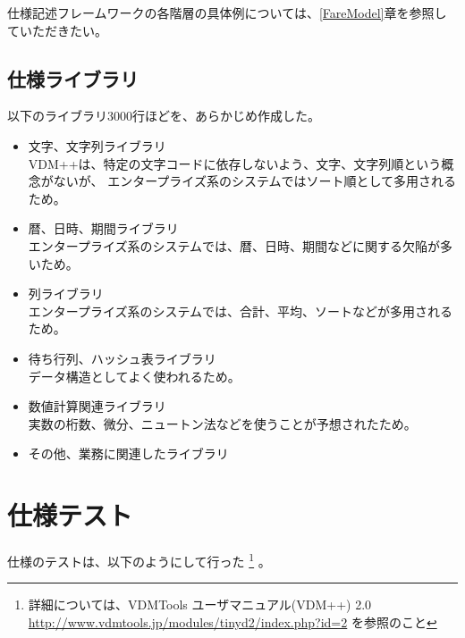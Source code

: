	仕様記述フレームワークの各階層の具体例については、\ref{FareModel}章を参照していただきたい。

\subsection{仕様ライブラリ}
	\label{SpecLibrary}

	以下のライブラリ3000行ほどを、あらかじめ作成した。

	\begin{itemize}
	\item 文字、文字列ライブラリ \\
		VDM++は、特定の文字コードに依存しないよう、文字、文字列順という概念がないが、
		エンタープライズ系のシステムではソート順として多用されるため。
	\item 暦、日時、期間ライブラリ \\
		エンタープライズ系のシステムでは、暦、日時、期間などに関する欠陥が多いため。
	\item 列ライブラリ \\
		エンタープライズ系のシステムでは、合計、平均、ソートなどが多用されるため。
	\item 待ち行列、ハッシュ表ライブラリ \\
		データ構造としてよく使われるため。
	\item 数値計算関連ライブラリ \\
		実数の桁数、微分、ニュートン法などを使うことが予想されたため。
	\item その他、業務に関連したライブラリ
	\end{itemize}

\section{仕様テスト}
	\label{SpecTest}

	仕様のテストは、以下のようにして行った
	\footnote{詳細については、VDMTools ユーザマニュアル(VDM++) 2.0
		{\url{http://www.vdmtools.jp/modules/tinyd2/index.php?id=2}}
	を参照のこと}
	。


